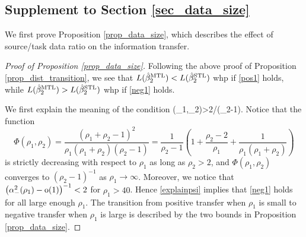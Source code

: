 \subsection{Supplement to Section \ref{sec_data_size}} \label{app_proof_32}
We first prove Proposition \ref{prop_data_size}, which describes the effect of source/task data ratio on the information transfer. 

\begin{proof}[Proof of Proposition \ref{prop_data_size}]
Following the above proof of Proposition \ref{prop_dist_transition}, we see that $L(\hat{\beta}_2^{\text{MTL}})< L(\hat{\beta}_2^{\text{STL}})$ whp if \eqref{pos1} holds, while $L(\hat{\beta}_2^{\text{MTL}})>L(\hat{\beta}_2^{\text{STL}})$ whp if \eqref{neg1} holds. 

We first explain the meaning of the condition 
\be\label{explainpsi}\Psi(\beta_1,\beta_2)>2/(\rho_2-1).\ee 
Notice that the function
$$ \Phi(\rho_1, \rho_2)=\frac{(\rho_1 + \rho_2 - 1)^2}{\rho_1 (\rho_1 + \rho_2) (\rho_2 - 1)}=\frac{1}{\rho_2-1} \left(1 +\frac{\rho_2-2}{\rho_1}+\frac{1}{\rho_1(\rho_1+\rho_2)}\right)$$
is strictly decreasing with respect to $\rho_1$ as long as $\rho_2> 2$, and $ \Phi(\rho_1, \rho_2)$ converges to $(\rho_2-1)^{-1}$ as $\rho_1\to \infty$.  Moreover, we notice that $\left( \alpha_-^2(\rho_1) -  \operatorname{o}(1) \right)^{-1} < 2$ for $\rho_1>40$. Hence \eqref{explainpsi} implies that \eqref{neg1} holds for all  large enough $\rho_1$. The transition from positive transfer when $\rho_1$ is small to negative transfer when $\rho_1$ is large is described by the two bounds in Proposition \ref{prop_data_size}.
 



\end{proof}
